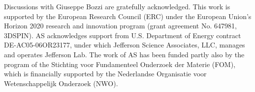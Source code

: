 \documentclass[aps,preprintnumbers,showpacs,nofootinbib,superscriptaddress,floatfix]{revtex4}
\begin{document}
\begin{acknowledgments}
Discussions with Giuseppe Bozzi are gratefully acknowledged.
This work is supported by the European Research Council (ERC) under the European Union's Horizon 2020 research and innovation program (grant agreement No. 647981, 3DSPIN). 
AS acknowledges support from U.S. Department of Energy contract DE-AC05-06OR23177, under which Jefferson Science Associates, LLC, manages and operates Jefferson Lab. 
The work of AS has been funded partly also by the program of the Stichting voor Fundamenteel Onderzoek der Materie (FOM), which is financially supported by the Nederlandse Organisatie voor Wetenschappelijk Onderzoek (NWO).
\end{acknowledgments}
%
%

%

%
%
\end{document}
